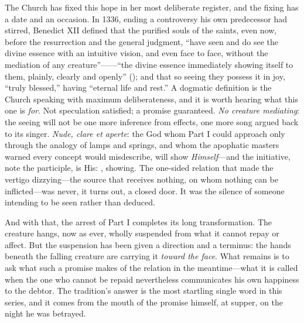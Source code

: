 The Church has fixed this hope in her most deliberate register, and the fixing has a date and an occasion. In 1336, ending a controversy his own predecessor had stirred, Benedict XII defined that the purified souls of the saints, even now, before the resurrection and the general judgment, ``have seen and do see the divine essence with an intuitive vision, and even face to face, without the mediation of any creature''------``the divine essence immediately showing itself to them, plainly, clearly and openly'' (); and that so seeing they possess it in joy, ``truly blessed,'' having ``eternal life and rest.'' A dogmatic definition is the Church speaking with maximum deliberateness, and it is worth hearing what this one is \emph{for}. Not speculation satisfied; a promise guaranteed. \emph{No creature mediating}: the seeing will not be one more inference from effects, one more song argued back to its singer. \emph{Nude, clare et aperte}: the God whom Part I could approach only through the analogy of lamps and springs, and whom the apophatic masters warned every concept would misdescribe, will show \emph{Himself}---and the initiative, note the participle, is His: , showing. The one-sided relation that made the vertigo dizzying---the source that receives nothing, on whom nothing can be inflicted---was never, it turns out, a closed door. It was the silence of someone intending to be seen rather than deduced.

And with that, the arrest of Part I completes its long transformation. The creature hangs, now as ever, wholly suspended from what it cannot repay or affect. But the suspension has been given a direction and a terminus: the hands beneath the falling creature are carrying it \emph{toward the face}. What remains is to ask what such a promise makes of the relation in the meantime---what it is called when the one who cannot be repaid nevertheless communicates his own happiness to the debtor. The tradition's answer is the most startling single word in this series, and it comes from the mouth of the promise himself, at supper, on the night he was betrayed.
